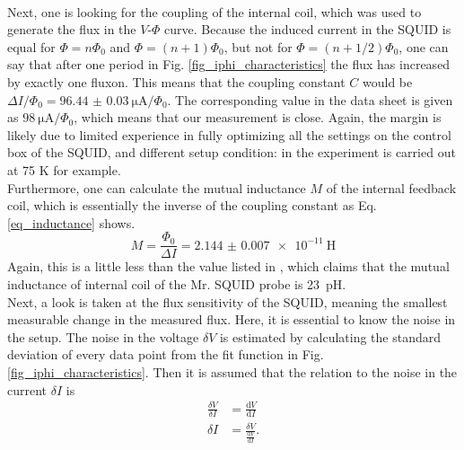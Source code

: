 \documentclass[a4paper,10pt]{article}
\newcommand{\dif}{\mathrm{d}}
\begin{document}
\\ %
Next, one is looking for the coupling of the internal coil, which was used to generate the flux in the $V$-$\Phi$ curve. Because the induced current in the SQUID is equal for $\Phi = n \Phi_0$ and $\Phi = (n + 1) \Phi_0$, but not for $\Phi = (n + 1/2) \Phi_0$, one can say that after one period in Fig. \ref{fig_iphi_characteristics} the flux has increased by exactly one fluxon. This means that the coupling constant $C$ would be $\Delta I / \Phi_0 = \SI{96.44(3)}{\micro \ampere} / \Phi_0$. The corresponding value in the data sheet \cite{datasheet} is given as $\SI{98}{\micro \ampere} / \Phi_0$, which means that our measurement is close. Again, the margin is likely due to limited experience in fully optimizing all the settings on the control box of the SQUID, and different setup condition: in \cite{datasheet} the experiment is carried out at 75 K for example.
\\
Furthermore, one can calculate the mutual inductance $M$ of the internal feedback coil, which is essentially the inverse of the coupling constant as Eq. \ref{eq_inductance} shows. 
\begin{equation}
    \label{eq_inductance}
    M = \frac{\Phi_0}{\Delta I} = \SI{2.144(7)e-11}{\henry}
\end{equation}
Again, this is a little less than the value listed in \cite{skriptum}, which claims that the mutual inductance of internal coil of the Mr. SQUID probe is \SI{23}{\pico \henry}. \\
Next, a look is taken at the flux sensitivity of the SQUID, meaning the smallest measurable change in the measured flux. Here, it is essential to know the noise in the setup. The noise in the voltage $\delta V$ is estimated by calculating the standard deviation of every data point from the fit function in Fig. \ref{fig_iphi_characteristics}. Then it is assumed that the relation to the noise in the current $\delta I$ is 
\begin{equation}
    \begin{split}
        \label{eq_noise}
        \frac{\delta V}{\delta I} &= \frac{\dif V}{\dif I} \\
        \delta I &= \frac{\delta V}{\frac{\dif V}{\dif I}}. 
    \end{split}
\end{equation}
\end{document}
